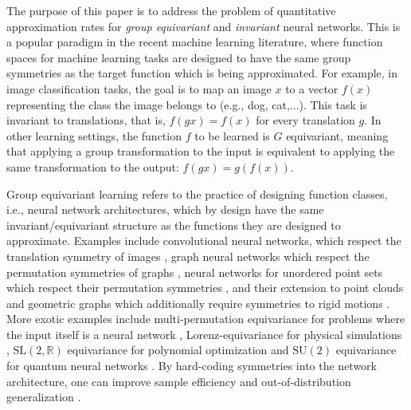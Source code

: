 \documentclass[twoside,11pt]{article}
\begin{document}

The purpose of this paper is to address the problem of quantitative approximation rates for \textit{group equivariant} and \textit{invariant} neural networks. This is a  popular paradigm in the recent machine learning literature, where function spaces for machine learning tasks are designed to have the same group symmetries as the target function which is being approximated. For example, in image classification tasks, the goal is to map an image $x$ to a vector $f(x)$ representing the class the image belongs to (e.g., dog, cat,...). This task is invariant to translations, that is, $f(gx)=f(x)$ for every translation $g$. In other learning settings, the function $f$ to be learned is $G$ equivariant, meaning that applying a group transformation to the input is equivalent to applying the same transformation to the output: $f(gx)=g(f(x))$. %


Group equivariant learning refers to the practice of designing function classes, i.e., neural network architectures, which by design have the same invariant/equivariant structure as the functions %
they are designed to approximate. Examples include convolutional neural networks, which respect the translation symmetry of images \citep{alexnet,zhang2019making}, graph neural networks which respect the permutation symmetries of graphs \citep{xu2018how,ppgn}, neural networks for unordered point sets which respect their permutation symmetries \citep{zaheer2017deep,pointnet}, and their extension to point clouds and geometric graphs which additionally require symmetries to rigid motions \citep{satorras2021n,gasteiger2020directional}. More exotic examples include multi-permutation equivariance for problems where the input itself is a neural network \citep{navon2023equivariant}, Lorenz-equivariance for physical simulations \citep{bogatskiy2020lorentz}, $\mathrm{SL}(2,\mathbb{R})$ equivariance for polynomial optimization \citep{lawrence2024learning} and $\mathrm{SU}(2)$ equivariance for quantum neural networks \citep{su2}. By hard-coding symmetries into the network architecture, one can improve sample efficiency and out-of-distribution generalization \citep{elesedy2021provably, mei2021, Batzner2022-sr}. 
\end{document}
